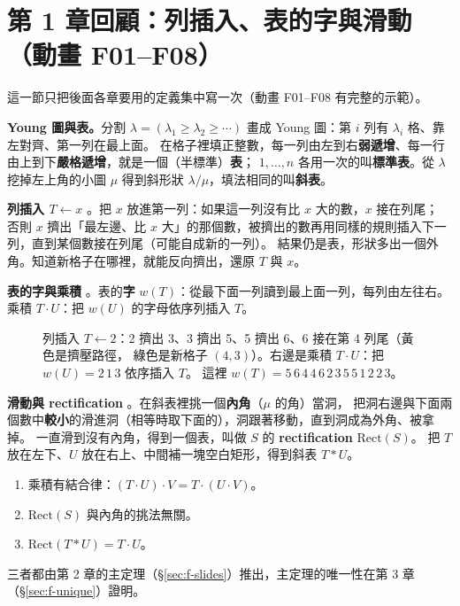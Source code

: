 

\section{第 1 章回顧：列插入、表的字與滑動（動畫 F01--F08）}\label{sec:f-recap}

這一節只把後面各章要用的定義集中寫一次（動畫 F01--F08 有完整的示範）。

\textbf{Young 圖與表。}分割 $\lambda=(\lambda_1\ge\lambda_2\ge\cdots)$ 畫成 Young 圖：第 $i$ 列有 $\lambda_i$ 格、靠左對齊、第一列在最上面。
在格子裡填正整數，每一列由左到右\textbf{弱遞增}、每一行由上到下\textbf{嚴格遞增}，就是一個（半標準）\textbf{表}；
$1,\ldots,n$ 各用一次的叫\textbf{標準表}。從 $\lambda$ 挖掉左上角的小圖 $\mu$ 得到斜形狀 $\lambda/\mu$，填法相同的叫\textbf{斜表}。

\textbf{列插入 $T\leftarrow x$} 。把 $x$ 放進第一列：如果這一列沒有比 $x$ 大的數，$x$ 接在列尾；
否則 $x$ 擠出「最左邊、比 $x$ 大」的那個數，被擠出的數再用同樣的規則插入下一列，直到某個數接在列尾（可能自成新的一列）。
結果仍是表，形狀多出一個外角。知道新格子在哪裡，就能反向擠出，還原 $T$ 與 $x$。

\textbf{表的字與乘積} 。表的\textbf{字} $w(T)$：從最下面一列讀到最上面一列，每列由左往右。
乘積 $T\cdot U$：把 $w(U)$ 的字母依序列插入 $T$。

\begin{figure}[H]
\centering
\FulRecap
\caption{列插入 $T\leftarrow 2$：2 擠出 3、3 擠出 5、5 擠出 6、6 接在第 4 列尾（\colorbox{yellow!45}{黃色}是擠壓路徑，
\colorbox{cC!35}{綠色}是新格子 $(4,3)$）。右邊是乘積 $T\cdot U$：把 $w(U)=2\,1\,3$ 依序插入 $T$。
這裡 $w(T)=5\,6\,4\,4\,6\,2\,3\,5\,5\,1\,2\,2\,3$。}
\label{fig:f-recap}
\end{figure}

\textbf{滑動與 rectification} 。在斜表裡挑一個\textbf{內角}（$\mu$ 的角）當洞，
把洞右邊與下面兩個數中\textbf{較小}的滑進洞（相等時取下面的），洞跟著移動，直到洞成為外角、被拿掉。
一直滑到沒有內角，得到一個表，叫做 $S$ 的 \textbf{rectification} $\mathrm{Rect}(S)$。
把 $T$ 放在左下、$U$ 放在右上、中間補一塊空白矩形，得到斜表 $T*U$。

\begin{keybox}
\begin{enumerate}[nosep]
\item 乘積有結合律：$(T\cdot U)\cdot V=T\cdot(U\cdot V)$。
\item $\mathrm{Rect}(S)$ 與內角的挑法無關。
\item $\mathrm{Rect}(T*U)=T\cdot U$。
\end{enumerate}
三者都由第 2 章的主定理（\S\ref{sec:f-slides}）推出，主定理的唯一性在第 3 章（\S\ref{sec:f-unique}）證明。
\end{keybox}

